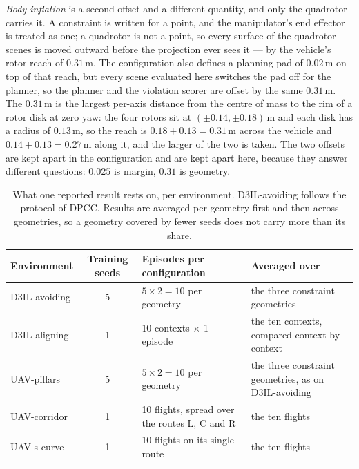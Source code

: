 \emph{Body inflation} is a second offset and a different quantity, and only the quadrotor carries it. A
constraint is written for a point, and the manipulator's end effector is treated as one; a quadrotor is
not a point, so every surface of the quadrotor scenes is moved outward before the projection ever sees it
--- by the vehicle's rotor reach of $0.31$\,m. The configuration also defines a planning pad of $0.02$\,m
on top of that reach, but every scene evaluated here switches the pad off for the planner, so the planner
and the violation scorer are offset by the same $0.31$\,m. The $0.31$\,m is the
largest per-axis distance from the centre of mass to the rim of a rotor disk at zero yaw: the four rotors
sit at $(\pm 0.14, \pm 0.18)$\,m and each disk has a radius of $0.13$\,m, so the reach is
$0.18+0.13=0.31$\,m across the vehicle and $0.14+0.13=0.27$\,m along it, and the larger of the two is
taken. The two offsets are kept apart in the configuration and are kept apart here, because they answer
different questions: $0.025$ is margin, $0.31$ is geometry.

\begin{table}[htpb]
  \caption[Evaluation protocol per environment]{What one reported result rests on, per environment.
  D3IL-avoiding follows the protocol of \ac{DPCC}. Results are averaged per geometry first and then
  across geometries, so a geometry covered by fewer seeds does not carry more than its share.}
  \label{tab:protocol}
  \centering
  \small
  \setlength{\tabcolsep}{6pt}
  \renewcommand{\arraystretch}{1.2}
  \begin{tabularx}{\linewidth}{@{}l c L X@{}}
    \toprule
    Environment & Training seeds & Episodes per configuration & Averaged over \\
    \midrule
    D3IL-avoiding & 5
      & $5\times2 = 10$ per geometry
      & the three constraint geometries \\
    D3IL-aligning & 1
      & 10 contexts $\times$ 1 episode
      & the ten contexts, compared context by context \\
    UAV-pillars & 5 & $5\times2 = 10$ per geometry & the three constraint geometries, as on D3IL-avoiding \\
    UAV-corridor & 1 & 10 flights, spread over the routes L, C and R & the ten flights \\
    UAV-s-curve & 1 & 10 flights on its single route & the ten flights \\
    \bottomrule
  \end{tabularx}
\end{table}


